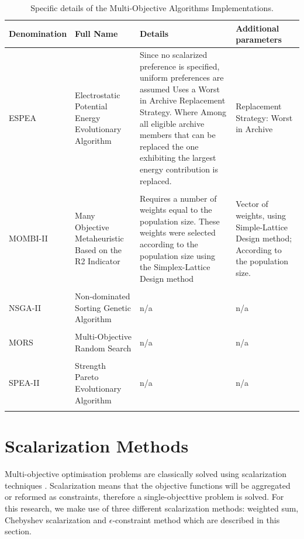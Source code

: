 \par
\begin{table}[H]
    \begin{tabular}{p{}p{}p{}p{}}
    \hline
    Denomination  & Full Name & Details & Additional parameters \\
    \hline
    ESPEA         & Electrostatic Potential Energy Evolutionary Algorithm  & Since no scalarized preference is specified, uniform preferences are assumed
    Uses a Worst in Archive Replacement Strategy. 
    Where Among all eligible archive members that can be replaced the one exhibiting the largest energy contribution is replaced. & Replacement Strategy: Worst in Archive \\ \\
    MOMBI-II        & Many Objective Metaheuristic Based on the R2 Indicator & Requires a number of weights equal to the population size. These weights were selected according to the population size using the Simplex-Lattice Design method & Vector of weights, using Simple-Lattice Design method; According to the population size. \\ \\
    NSGA-II       & Non-dominated Sorting Genetic Algorithm               & n/a & n/a \\ \\
    MORS          & Multi-Objective Random Search                                          & n/a  & n/a \\ \\ 
    SPEA-II        & Strength Pareto Evolutionary Algorithm                 & n/a  & n/a \\ \\
    \hline                                                                                                                 
    \end{tabular}
    \caption{Specific details of the Multi-Objective Algorithms Implementations.}
    \label{table:(MOA)_details}
\end{table}

\section{Scalarization Methods}
\label{sec:scalarization}

Multi-objective optimisation problems are classically solved using scalarization techniques \cite{Emmerich2018}. Scalarization means that the objective functions will be aggregated or reformed as constraints, therefore a single-objecttive problem is solved. For this research, we make use of three different scalarization methods: weighted sum, Chebyshev scalarization and $\epsilon$-constraint method which are described in this section.

